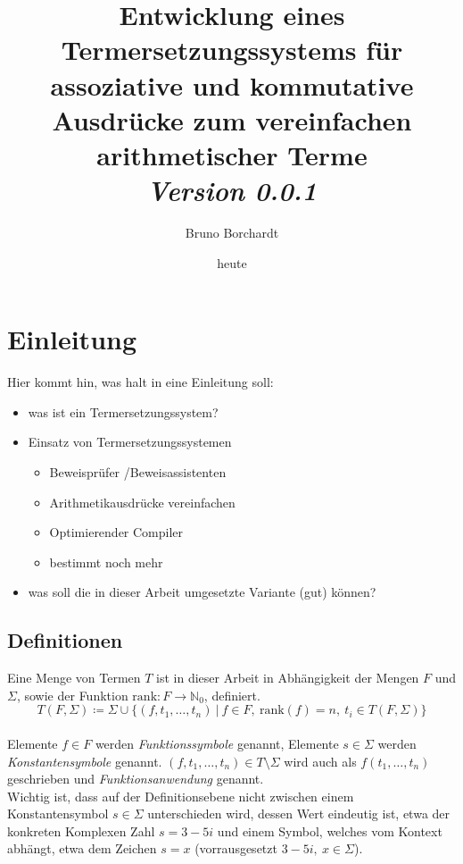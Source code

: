 \documentclass{article}
\title{Entwicklung eines Termersetzungssystems für assoziative und kommutative Ausdrücke zum vereinfachen arithmetischer Terme\\ \textit{Version 0.0.1}}
\author{Bruno Borchardt}
\date{heute}
\begin{document}
\maketitle

\tableofcontents

\clearpage

\section{Einleitung}

Hier kommt hin, was halt in eine Einleitung soll:
\begin{itemize}
    \item was ist ein Termersetzungssystem?
    \item Einsatz von Termersetzungssystemen
    \begin{itemize}
        \item Beweisprüfer /Beweisassistenten
        \item Arithmetikausdrücke vereinfachen
        \item Optimierender Compiler
        \item bestimmt noch mehr
    \end{itemize}
    \item was soll die in dieser Arbeit umgesetzte Variante (gut) können?
    
\end{itemize}
\subsection{Definitionen}
Eine Menge von Termen $T$ ist in dieser Arbeit in Abhängigkeit der Mengen $F$ und $\Sigma$, sowie der Funktion $\mathrm{rank} : F \rightarrow \mathbb{N}_0$, definiert. $$T(F, \Sigma) \coloneqq \Sigma \cup \{(f, t_1, \dots, t_n)~|~f\in F,~\mathrm{rank}(f) = n,~ t_i \in T(F, \Sigma)\}$$ \\
Elemente $f\in F$ werden \textit{Funktionssymbole} genannt, Elemente $s \in \Sigma$ werden \textit{Konstantensymbole} genannt. $(f, t_1, \dots, t_n) \in T \setminus \Sigma$ wird auch als $f(t_1, \dots, t_n)$ geschrieben und \textit{Funktionsanwendung} genannt. \\
Wichtig ist, dass auf der Definitionsebene nicht zwischen einem Konstantensymbol $s \in \Sigma$ unterschieden wird, dessen Wert eindeutig ist, etwa der konkreten Komplexen Zahl $s = 3-5i$ und einem Symbol, welches vom Kontext abhängt, etwa dem Zeichen $s = x$ (vorrausgesetzt $3-5i,~x \in \Sigma$). 
\end{document}
